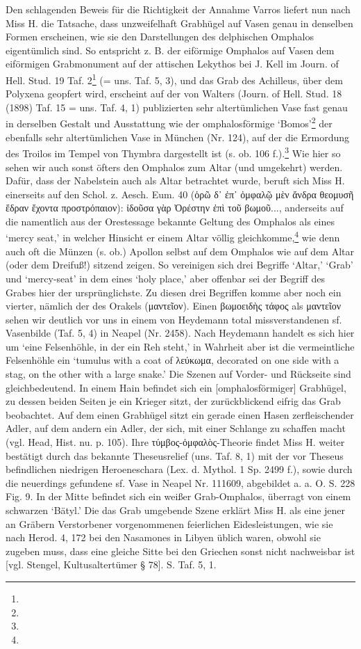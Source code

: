 \documentclass[a4paper, 11pt, oneside]{article}
\begin{document}
Den schlagenden Beweis für die Richtigkeit der Annahme Varros liefert nun nach Miss H. die Tatsache, dass unzweifelhaft Grabhügel auf Vasen genau in denselben Formen erscheinen, wie sie den Darstellungen des delphischen Omphalos eigentümlich sind. So entspricht z. B. der eiförmige Omphalos auf Vasen dem eiförmigen Grabmonument auf der attischen Lekythos bei J. Kell im Journ. of Hell. Stud. 19 Taf. 2\footnote{} (= uns. Taf. 5, 3), und das Grab des Achilleus, über dem Polyxena geopfert wird, erscheint auf der von Walters (Journ. of Hell. Stud. 18 (1898) Taf. 15 = uns. Taf. 4, 1) publizierten sehr altertümlichen Vase fast genau in derselben Gestalt und Ausstattung wie der omphalosförmige `Bomos'\footnote{} der ebenfalls sehr altertümlichen Vase in München (Nr. 124), auf der die Ermordung des Troilos im Tempel von Thymbra dargestellt ist (s. ob. 106 f.).\footnote{} Wie hier so sehen wir auch sonst öfters den Omphalos zum Altar (und umgekehrt) werden. Dafür, dass der Nabelstein auch als Altar betrachtet wurde, beruft sich Miss H. einerseits auf den Schol. z. Aesch. Eum. 40 (ὁρῶ δ᾽ ἐπ᾽ ὀμφαλῷ μὲν ἄνδρα θεομυσῆ ἕδραν ἔχοντα προστρόπαιον): ἰδοῦσα γὰρ Ὀρέστην ἐπὶ τοῦ βωμοῦ..., anderseits auf die namentlich aus der Orestessage bekannte Geltung des Omphalos als eines `mercy seat,' in welcher Hinsicht er einem Altar völlig gleichkomme,\footnote{} wie denn auch oft die Münzen (s. ob.) Apollon selbst auf dem Omphalos wie auf dem Altar (oder dem Dreifuß!) sitzend zeigen. So vereinigen sich drei Begriffe `Altar,' `Grab' und `mercy-seat' in dem eines `holy place,' aber offenbar sei der Begriff des Grabes hier der ursprünglichste. Zu diesen drei Begriffen komme aber noch ein vierter, nämlich der des Orakels (μαντεῖον). Einen βωμοειδὴς τάφος als μαντεῖον sehen wir deutlich vor uns in einem von Heydemann total missverstandenen sf. Vasenbilde (Taf. 5, 4) in Neapel (Nr. 2458). Nach Heydemann handelt es sich hier um `eine Felsenhöhle, in der ein Reh steht,' in Wahrheit aber ist die vermeintliche Felsenhöhle ein `tumulus with a coat of λεύκωμα, decorated on one side with a stag, on the other with a large snake.' Die Szenen auf Vorder- und Rückseite sind gleichbedeutend. In einem Hain befindet sich ein [omphalosförmiger] Grabhügel, zu dessen beiden Seiten je ein Krieger sitzt, der zurückblickend eifrig das Grab beobachtet. Auf dem einen Grabhügel sitzt ein gerade einen Hasen zerfleischender Adler, auf dem andern ein Adler, der sich, mit einer Schlange zu schaffen macht (vgl. Head, Hist. nu. p. 105). Ihre τύμβος-ὀμφαλὸς-Theorie findet Miss H. weiter bestätigt durch das bekannte Theseusrelief (uns. Taf. 8, 1) mit der vor Theseus befindlichen niedrigen Heroeneschara (Lex. d. Mythol. 1 Sp. 2499 f.), sowie durch die neuerdings gefundene sf. Vase in Neapel Nr. 111609, abgebildet a. a. O. S. 228 Fig. 9. In der Mitte befindet sich ein weißer Grab-Omphalos, überragt von einem schwarzen `Bätyl.' Die das Grab umgebende Szene erklärt Miss H. als eine jener an Gräbern Verstorbener vorgenommenen feierlichen Eidesleistungen, wie sie nach Herod. 4, 172 bei den Nasamones in Libyen üblich waren, obwohl sie zugeben muss, dass eine gleiche Sitte bei den Griechen sonst nicht nachweisbar ist [vgl. Stengel, Kultusaltertümer § 78]. S. Taf. 5, 1.
\end{document}
